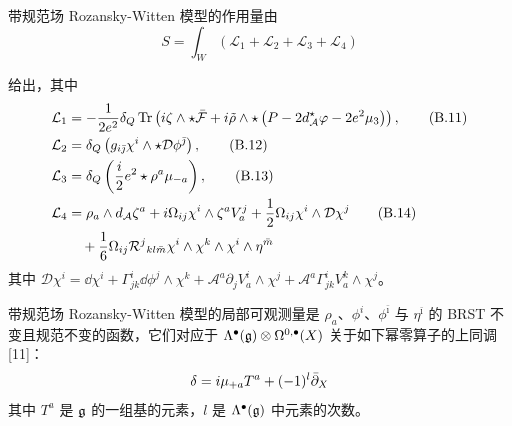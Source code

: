 带规范场 Rozansky-Witten 模型的作用量由
\[
  S=\int_W\left(\mathcal{L}_1+\mathcal{L}_2+\mathcal{L}_3+\mathcal{L}_4\right)
\]


给出，其中
\begin{align}
  \mathcal{L}_1 &= -\frac{1}{2e^2}\delta_Q\operatorname{Tr}\left(i\zeta\wedge\star\bar{\mathcal F}
    +i\tilde\rho\wedge\star\left(P-2d^\star_{\mathcal A}\varphi-2e^2\mu_3\right)\right), \tag{B.11}\\
  \mathcal{L}_2 &= \delta_Q\left(g_{i\bar\jmath}\chi^i\wedge\star\mathcal{D}\phi^{\bar\jmath}\right), \tag{B.12}\\
  \mathcal{L}_3 &= \delta_Q\left(\frac{i}{2}e^2\star\rho^a\mu_{-a}\right), \tag{B.13}\\
  \mathcal{L}_4 &= \rho_a\wedge d_{\mathcal A}\zeta^a+i\Omega_{ij}\chi^i\wedge\zeta^aV^j_a
    +\frac12\Omega_{ij}\chi^i\wedge\mathcal{D}\chi^j \tag{B.14}\\
  &\quad+\frac16\Omega_{ij}\mathcal{R}^j{}_{kl\bar m}\chi^i\wedge\chi^k\wedge\chi^i\wedge\eta^{\bar m} \notag
\end{align}
其中 $\mathcal{D}\chi^i=\dd\chi^i+\Gamma^i_{jk}\dd\phi^j\wedge\chi^k+\mathcal{A}^a\partial_jV^i_a\wedge\chi^j+\mathcal{A}^a\Gamma^i_{jk}V^k_a\wedge\chi^j$。

带规范场 Rozansky-Witten 模型的局部可观测量是 $\rho_a$、$\phi^i$、$\phi^{\bar\imath}$ 与 $\eta^{\bar\imath}$ 的 BRST 不变且规范不变的函数，它们对应于 $\Lambda^\bullet(\mathfrak{g})\otimes\Omega^{0,\bullet}(X)$ 关于如下幂零算子的上同调 [11]：
\[
  \delta=i\mu_{+a}T^a+(-1)^l\bar{\partial}_X
\]
其中 $T^a$ 是 $\mathfrak{g}$ 的一组基的元素，$l$ 是 $\Lambda^\bullet(\mathfrak{g})$ 中元素的次数。


